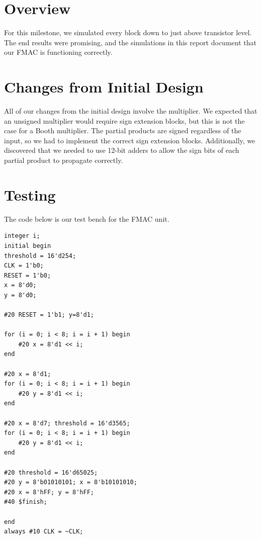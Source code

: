 \documentclass{memo}
\begin{document}
\maketitle

\section{Overview}
For this milestone, we simulated every block down to just above transistor level. The end results were promising, and the simulations in this report document that our FMAC is functioning correctly.

\section{Changes from Initial Design}
All of our changes from the initial design involve the multiplier. We expected that an unsigned multiplier would require sign extension blocks, but this is not the case for a Booth multiplier. The partial products are signed regardless of the input, so we had to implement the correct sign extension blocks. Additionally, we discovered that we needed to use 12-bit adders to allow the sign bits of each partial product to propagate correctly.

\section{Testing}
The code below is our test bench for the FMAC unit.
\begin{lstlisting}
integer i;
initial begin
threshold = 16'd254;
CLK = 1'b0;
RESET = 1'b0;
x = 8'd0;
y = 8'd0;

#20 RESET = 1'b1; y=8'd1;

for (i = 0; i < 8; i = i + 1) begin
    #20 x = 8'd1 << i;
end

#20 x = 8'd1;
for (i = 0; i < 8; i = i + 1) begin
    #20 y = 8'd1 << i;
end

#20 x = 8'd7; threshold = 16'd3565;
for (i = 0; i < 8; i = i + 1) begin
    #20 y = 8'd1 << i;
end

#20 threshold = 16'd65025;
#20 y = 8'b01010101; x = 8'b10101010;
#20 x = 8'hFF; y = 8'hFF;
#40 $finish;

end
always #10 CLK = ~CLK;
\end{lstlisting}
\end{document}
